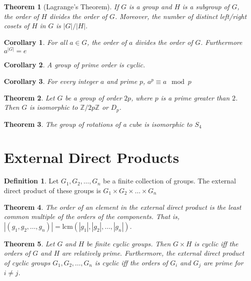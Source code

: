 \documentclass{article}
\newcommand{\Z}{\mathbb{Z}}
\newtheorem{theorem}{Theorem}[section]
\newtheorem*{corollary}{Corollary}
\theoremstyle{definition}
\newtheorem*{definition}{Definition}
\begin{document}
\begin{theorem}[Lagrange's Theorem]
    If $G$ is a group and $H$ is a subgroup of $G$, the order of $H$ divides the order of $G$. Moreover, the number of distinct left/right cosets of $H$ in $G$ is $|G|/|H|$.
\end{theorem}

\begin{corollary}
    For all $a \in G$, the order of $a$ divides the order of $G$. Furthermore $a^{|G|} = e$
\end{corollary}

\begin{corollary}
    A group of prime order is cyclic. 
\end{corollary}

\begin{corollary}
    For every integer $a$ and prime $p$, $a^p \equiv a \mod p$
\end{corollary}
    
\begin{theorem}
    Let $G$ be a group of order $2p$, where $p$ is a prime greater than $2$. Then $G$ is isomorphic to $\Z/2p\Z$ or $D_p$.
\end{theorem}


\begin{theorem}
    The group of rotations of a cube is isomorphic to $S_4$
\end{theorem}

\section{External Direct Products}

\begin{definition}
    Let $G_1, G_2, \dots, G_n$ be a finite collection of groups. The external direct product of these groups is $G_1 \times G_2 \times \dots \times G_n$
\end{definition}

\begin{theorem}
    The order of an element in the external direct product is the least common multiple of the orders of the components. That is, $|(g_1, g_2, \dots, g_n)| = \text{lcm}(|g_1|, |g_2|, \dots, |g_n|)$.
\end{theorem}

\begin{theorem}
    Let $G$ and $H$ be finite cyclic groups. Then $G \times H$ is cyclic iff the orders of $G$ and $H$ are relatively prime. Furthermore, the external direct product of cyclic groups $G_1, G_2, \dots, G_n$ is cyclic iff the orders of $G_i$ and $G_j$ are prime for $i \neq j$.
\end{theorem}
\end{document}
